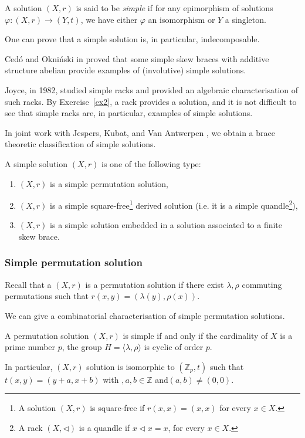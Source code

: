 \begin{definition}
    A solution $(X,r)$ is said to be \emph{simple} if for any epimorphism of solutions $\varphi: (X,r) \to (Y,t)$, we have either $\varphi$ an isomorphism or $Y$ a singleton.
\end{definition}

One can prove that a simple solution is, in particular, indecomposable. 

Cedó and Okniński in \cite{MR4391683} proved that some simple skew braces with additive structure abelian provide examples of (involutive) simple solutions. 

Joyce, in 1982, studied simple racks and provided an algebraic characterisation of such racks. By Exercise~\ref{ex2}, a rack provides a solution, and it is not difficult to see that simple racks are, in particular, examples of simple solutions. 

In joint work with Jespers, Kubat, and Van Antwerpen \cite{colazzo2023simple}, we obtain a brace theoretic classification of simple solutions. 

\begin{theorem}
    A simple solution $(X,r)$ is one of the following type:
    \begin{enumerate}
        \item $(X,r)$ is a simple permutation solution,
        \item $(X,r)$ is a simple square-free\footnote{A solution $(X,r)$ is square-free if $r(x,x)=(x,x)$ for every $x\in X$.} derived solution (i.e. it is a simple quandle\footnote{A rack $(X,\triangleleft)$ is a quandle if $x\triangleleft x = x$, for every $x\in X$.}),
        \item $(X,r)$ is a simple solution embedded in a solution associated to a finite skew brace. 
    \end{enumerate}
\end{theorem}

\subsubsection{Simple permutation solution}

Recall that a $(X,r)$ is a permutation solution if there exist $\lambda,\rho$ commuting permutations such that $r(x,y)=(\lambda(y),\rho(x))$.

We can give a combinatorial characterisation of simple permutation solutions.

\begin{proposition}
    A permutation solution $(X,r)$ is simple if and only if the cardinality of $X$ is a prime number $p$, the group $H=\langle\lambda,\rho\rangle$ is cyclic of order $p$.

    In particular, $(X,r)$ solution is isomorphic to $(\mathbb{Z}_p,t)$ such that $t(x,y)= (y+a,x+b)$ with $,a,b\in \mathbb{Z}$ and$(a,b)\neq (0,0)$.
\end{proposition}

